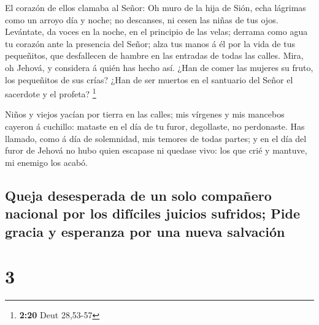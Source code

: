  El corazón de ellos clamaba al Señor: Oh muro de la hija
de Sión, echa lágrimas como un arroyo día y noche; no descanses, ni
cesen las niñas de tus ojos.  Levántate, da voces en la
noche, en el principio de las velas; derrama como agua tu corazón ante
la presencia del Señor; alza tus manos á él por la vida de tus
pequeñitos, que desfallecen de hambre en las entradas de todas las
calles.  Mira, oh Jehová, y considera á quién has hecho
así. ¿Han de comer las mujeres su fruto, los pequeñitos de sus crías?
¿Han de ser muertos en el santuario del Señor el sacerdote y el profeta?
\footnote{\textbf{2:20} Deut 28,53-57}

 Niños y viejos yacían por tierra en las calles; mis
vírgenes y mis mancebos cayeron á cuchillo: mataste en el día de tu
furor, degollaste, no perdonaste.  Has llamado, como á día
de solemnidad, mis temores de todas partes; y en el día del furor de
Jehová no hubo quien escapase ni quedase vivo: los que crié y mantuve,
mi enemigo los acabó.

\hypertarget{queja-desesperada-de-un-solo-compauxf1ero-nacional-por-los-difuxedciles-juicios-sufridos-pide-gracia-y-esperanza-por-una-nueva-salvaciuxf3n}{%
\subsection{Queja desesperada de un solo compañero nacional por los
difíciles juicios sufridos; Pide gracia y esperanza por una nueva
salvación}\label{queja-desesperada-de-un-solo-compauxf1ero-nacional-por-los-difuxedciles-juicios-sufridos-pide-gracia-y-esperanza-por-una-nueva-salvaciuxf3n}}

\hypertarget{section-2}{%
\section{3}\label{section-2}}

